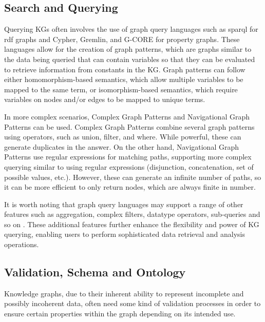 \documentclass[11pt]{article} %
\begin{document}
\subsection{Search and Querying}

Querying KGs often involves the use of graph query languages such as \acrshort{sparql} for \acrshort{rdf} graphs and Cypher, Gremlin, and G-CORE \cite{KG21} for property graphs. These languages allow for the creation of graph patterns, which are graphs similar to the data being queried that can contain variables so that they can be evaluated to retrieve information from constants in the KG. Graph patterns can follow either homomorphism-based semantics, which allow multiple variables to be mapped to the same term, or isomorphism-based semantics, which require variables on nodes and/or edges to be mapped to unique terms.

In more complex scenarios, Complex Graph Patterns and Navigational Graph Patterns can be used. Complex Graph Patterns combine several graph patterns using operators, such as union, filter, and where. While powerful, these can generate duplicates in the answer. On the other hand, Navigational Graph Patterns use regular expressions for matching paths, supporting more complex querying similar to using regular expressions (disjunction, concatenation, set of possible values, etc.). However, these can generate an infinite number of paths, so it can be more efficient to only return nodes, which are always finite in number.

It is worth noting that graph query languages may support a range of other features such as aggregation, complex filters, datatype operators, sub-queries and so on \cite{KG21}. These additional features further enhance the flexibility and power of KG querying, enabling users to perform sophisticated data retrieval and analysis operations.

\subsection{Validation, Schema and Ontology}

Knowledge graphs, due to their inherent ability to represent incomplete and possibly incoherent data, often need some kind of validation processes in order to ensure certain properties within the graph depending on its intended use.
\end{document}
